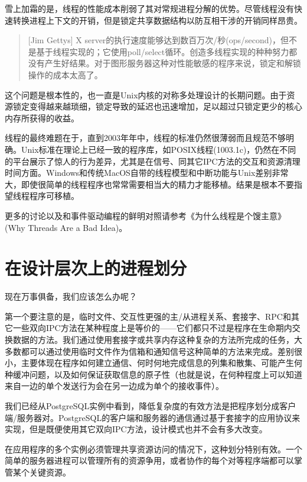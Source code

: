 \documentclass[12pt,oneside]{book}
\begin{document}
雪上加霜的是，线程的性能成本削弱了其对常规进程分解的优势。尽管线程没有快速转换进程上下文的开销，但是锁定共享数据结构以防互相干涉的开销同样昂贵。

\begin{quote}[Jim Gettys]
X server的执行速度能够达到数百万次/秒(ops/second)\linebreak ，但不是基于线程实现的；它使用poll/select循环。创造多线程实现的种种努力都没有产生好结果。对于图形服务器这种对性能敏感的程序来说，锁定和解锁操作的成本太高了。
\end{quote}

这个问题是根本性的，也一直是Unix内核的对称多处理设计的长期问题。由于资源锁定变得越来越琐细，锁定导致的延迟也迅速增加，足以超过只锁定更少的核心内存所获得的收益。

线程的最终难题在于，直到2003年年中，线程的标准仍然很薄弱而且规范不够明确。Unix标准在理论上已经一致的程序库，如POSIX线程(1003.1c)，仍然在不同的平台展示了惊人的行为差异，尤其是在信号、同其它IPC方法的交互和资源清理时间方面。Windows和传统MacOS自带的线程模型和中断功能与Unix差别非常大，即使很简单的线程程序也常常需要相当大的精力才能移植。结果是根本不要指望线程程序可移植。

更多的讨论以及和事件驱动编程的鲜明对照请参考《为什么线程是个馊主意》(Why Threads Are a Bad Idea)\cite{Ousterhout96}。


\section{在设计层次上的进程划分}
现在万事俱备，我们应该怎么办呢？

第一个要注意的是，临时文件、交互性更强的主/从进程关系、套接字、RPC和其它一些双向IPC方法在某种程度上是等价的——它们都只不过是程序在生命期内交换数据的方法。我们通过使用套接字或共享内存这种复杂的方法所完成的任务，大多数都可以通过使用临时文件作为信箱和通知信号这种简单的方法来完成。差别很小，主要体现在程序如何建立通信、何时何地完成信息的列集和散集、可能产生何种缓冲问题，以及如何保证获取信息的原子性（也就是说，在何种程度上可以知道来自一边的单个发送行为会在另一边成为单个的接收事件）。

我们已经从PostgreSQL实例中看到，降低复杂度的有效方法是把程序划分成客户端/服务器对。PostgreSQL的客户端和服务器的通信通过基于套接字的应用协议来实现，但是既便使用其它双向IPC方法，设计模式也并不会有多大改变。

在应用程序的多个实例必须管理共享资源访问的情况下，这种划分特别有效。一个简单的服务器进程可以管理所有的资源争用，或者协作的每个对等程序端都可以掌管某个关键资源。
\end{document}

